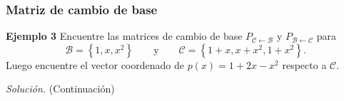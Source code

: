 \begin{frame}\frametitle{Matriz de cambio de base}
	
	\begin{ej}{\textbf{Ejemplo 3}}
		Encuentre las matrices de cambio de base $P_{\mathcal{C} \leftarrow\mathcal{B}}$ y $P_{\mathcal{B} \leftarrow\mathcal{C}}$
		para
		\[
		\mathcal{B} = \left\{ 1, x, x^2 \right\} \qquad \text{y} \qquad \mathcal{C} = \left\{ 1+x, x+x^2, 1+x^2 \right\}.
		\]
		Luego encuentre el vector coordenado de $p(x)=1+2x-x^2$ respecto a $\mathcal{C}$.
	\end{ej}
	\textit{Solución.} (Continuación)
	
\end{frame}



\subsection{}

